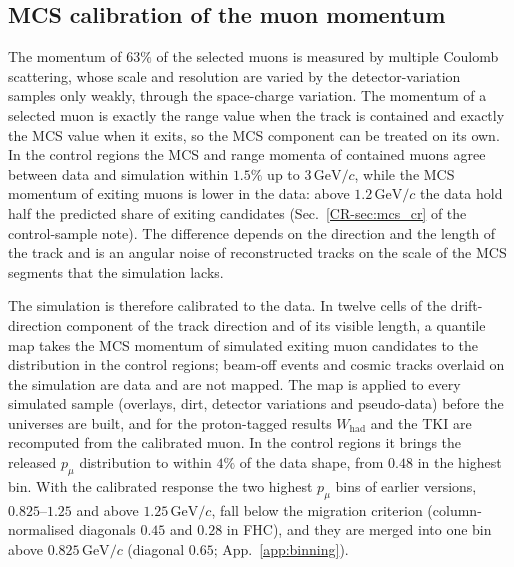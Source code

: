 \documentclass[11pt,a4paper]{article}
\newcommand{\GeVc}{\,\text{GeV}\!/c}
\newcommand{\crref}[2]{#1~\ref{CR-#2} of the control-sample note}
\begin{document}
\subsection{MCS calibration of the muon momentum}
\label{sec:mcs}

The momentum of $63\%$ of the selected muons is measured by multiple Coulomb scattering, whose scale
and resolution are varied by the detector-variation samples only weakly, through the space-charge variation. The
momentum of a selected muon is exactly the range value when the track is contained and exactly the MCS value when
it exits, so the MCS component can be treated on its own. In the control regions the MCS and range momenta of
contained muons agree between data and simulation within $1.5\%$ up to $3\GeVc$, while the MCS momentum of exiting
muons is lower in the data: above $1.2\GeVc$ the data hold half the predicted share of exiting candidates
(\crref{Sec.}{sec:mcs_cr}). The difference depends on the direction and the length of the track and is an angular
noise of reconstructed tracks on the scale of the MCS segments that the simulation lacks.

The simulation is therefore calibrated to the data. In twelve cells of the drift-direction component of the track
direction and of its visible length, a quantile map takes the MCS momentum of simulated exiting muon candidates to
the distribution in the control regions; beam-off events and cosmic tracks overlaid on the simulation are data and
are not mapped. The map is applied to every simulated sample (overlays, dirt, detector variations and pseudo-data)
before the universes are built, and for the proton-tagged results $W_\mathrm{had}$ and the TKI are recomputed from
the calibrated muon. In the control regions it brings the released $p_\mu$ distribution to within $4\%$ of the
data shape, from $0.48$ in the highest bin. With the calibrated response the two highest $p_\mu$ bins of earlier
versions, $0.825$--$1.25$ and above $1.25\GeVc$, fall below the migration criterion (column-normalised diagonals
$0.45$ and $0.28$ in FHC), and they are merged into one bin above $0.825\GeVc$ (diagonal $0.65$;
App.~\ref{app:binning}).
\end{document}
